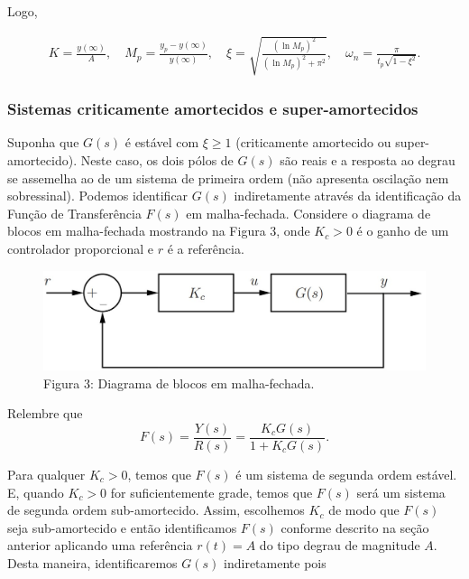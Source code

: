 \documentclass[
]{book}
\begin{document}
Logo,

\begin{align}
K = \frac {y(\infty)}{A}, \quad M_p = \frac {y_p - y(\infty)}{y(\infty)}, \quad \xi = \sqrt{\frac {(\ln{M_p})^2}{(\ln{M_p})^2+\pi^2}}, \quad \omega_n = \frac {\pi}{t_p\sqrt{1-\xi^2}}.  \label{eq:eq34}
\end{align}

\hypertarget{sistemas-criticamente-amortecidos-e-super-amortecidos}{%
\subsubsection{Sistemas criticamente amortecidos e super-amortecidos}\label{sistemas-criticamente-amortecidos-e-super-amortecidos}}

Suponha que \(G(s)\) é estável com \(\xi \geq 1\) (criticamente amortecido ou super-amortecido). Neste caso, os dois pólos de \(G(s)\) são reais e a resposta ao degrau se assemelha ao de um sistema de primeira ordem (não apresenta oscilação nem sobressinal). Podemos identificar \(G(s)\) indiretamente através da identificação da Função de Transferência \(F(s)\) em malha-fechada. Considere o diagrama de blocos em malha-fechada mostrando na Figura 3, onde \(K_c > 0\) é o ganho de um controlador proporcional e \(r\) é a referência.

\begin{figure}
\centering
\includegraphics{Imagens/Lab3/Explicação/fig3.jpg}
\caption{Figura 3: Diagrama de blocos em malha-fechada.}
\end{figure}

Relembre que
\[
F(s) = \frac {Y(s)}{R(s)} = \frac {K_cG(s)}{1+K_cG(s)}.
\]

Para qualquer \(K_c > 0\), temos que \(F(s)\) é um sistema de segunda ordem estável. E, quando \(K_c > 0\) for suficientemente grade, temos que \(F(s)\) será um sistema de segunda ordem sub-amortecido. Assim, escolhemos \(K_c\) de modo que \(F(s)\) seja sub-amortecido e então identificamos \(F(s)\) conforme descrito na seção anterior aplicando uma referência \(r(t) = A\) do tipo degrau de magnitude \(A\). Desta maneira, identificaremos \(G(s)\) indiretamente pois
\end{document}

